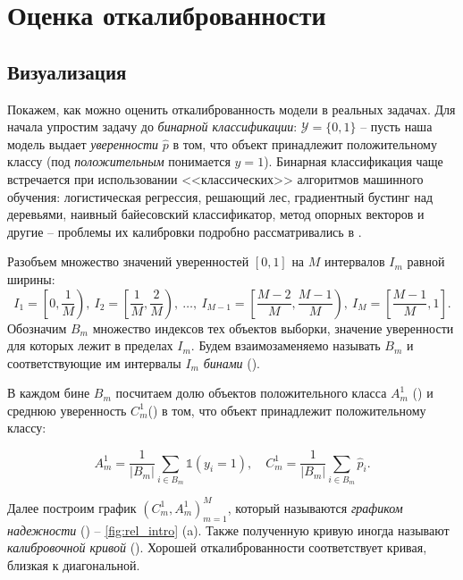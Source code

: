 \documentclass[12pt]{article}
\begin{document}
\section{Оценка откалиброванности}\label{sec:estimate}
\subsection{Визуализация}
Покажем, как можно оценить откалиброванность модели в реальных задачах. Для начала упростим задачу до \emph{бинарной классификации}: $\mathcal{Y}=\{0,1\}$ -- пусть наша модель выдает \emph{уверенности} $\hat{p}$ в том, что объект принадлежит положительному классу (под \emph{положительным} понимается $y=1$). Бинарная классификация чаще встречается при использовании <<классических>> алгоритмов машинного обучения: логистическая регрессия, решающий лес, градиентный бустинг над деревьями, наивный байесовский классификатор, метод опорных векторов и другие -- проблемы их калибровки подробно рассматривались в \cite{good_proba, emp_comparison}.


Разобъем множество значений уверенностей $[0, 1]$ на $M$ интервалов $I_m$ равной ширины:
\begin{equation}\label{eq:binning}
I_1= \left[0, \frac{1}{M}\right),\
I_2= \left[\frac{1}{M},\frac{2}{M}\right),\
\dots,\
I_{M-1}= \left[\frac{M-2}{M},\frac{M-1}{M}\right),\
I_{M} = \left[\frac{M-1}{M}, 1\right].
\end{equation}
Обозначим $B_m$ множество индексов тех объектов выборки, значение уверенности для которых лежит в пределах $I_m$. Будем взаимозаменяемо называть $B_m$ и соответствующие им интервалы $I_m$ \emph{бинами} ().

В каждом бине $B_m$ посчитаем долю объектов положительного класса $A^1_m$ () и среднюю уверенность $C^1_m$() в том, что объект принадлежит положительному классу:

\begin{equation}\label{eq:bin_accconf}
    A^1_m=\frac{1}{|B_m|}\sum_{i\in B_m} \mathbb{1}(y_i=1),
    \quad
    C^1_m=\frac{1}{|B_m|}\sum_{i\in B_m} \hat{p}_i.
\end{equation}

Далее построим график $(C^1_m, A^1_m)_{m=1}^M$, который называются \emph{графиком надежности} \cite{reldiag_idea, good_proba} () -- \autoref{fig:rel_intro} (a). Также полученную кривую иногда называют \emph{калибровочной кривой} (). Хорошей откалиброванности соответствует кривая, близкая к диагональной. 
\end{document}
